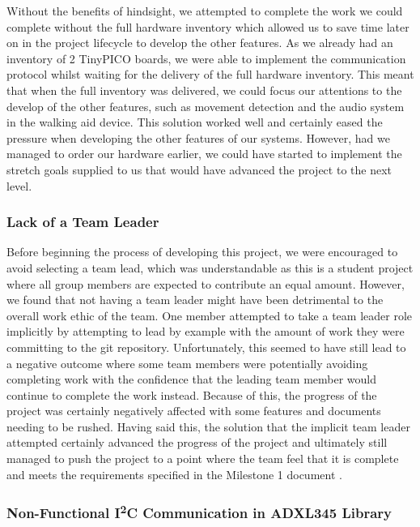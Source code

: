                 Without the benefits of hindsight, we attempted to complete the work we could complete without the full hardware inventory which allowed us to save time later on in the project lifecycle to develop the other features. As we already had an inventory of 2 TinyPICO boards, we were able to implement the communication protocol whilst waiting for the delivery of the full hardware inventory. This meant that when the full inventory was delivered, we could focus our attentions to the develop of the other features, such as movement detection and the audio system in the walking aid device. This solution worked well and certainly eased the pressure when developing the other features of our systems. However, had we managed to order our hardware earlier, we could have started to implement the stretch goals supplied to us that would have advanced the project to the next level.

            \subsubsection{Lack of a Team Leader}

                Before beginning the process of developing this project, we were encouraged to avoid selecting a team lead, which was understandable as this is a student project where all group members are expected to contribute an equal amount. However, we found that not having a team leader might have been detrimental to the overall work ethic of the team. One member attempted to take a team leader role implicitly by attempting to lead by example with the amount of work they were committing to the git repository. Unfortunately, this seemed to have still lead to a negative outcome where some team members were potentially avoiding completing work with the confidence that the leading team member would continue to complete the work instead. Because of this, the progress of the project was certainly negatively affected with some features and documents needing to be rushed. Having said this, the solution that the implicit team leader attempted certainly advanced the progress of the project and ultimately still managed to push the project to a point where the team feel that it is complete and meets the requirements specified in the Milestone 1 document \cite{coaker}.

            \subsubsection{Non-Functional I\textsuperscript{2}C Communication in ADXL345 Library}

